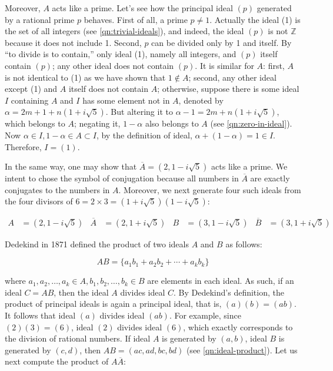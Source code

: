 \documentclass[b5paper]{article}
\begin{document}
Moreover, $A$ acts like a prime. Let's see how the principal ideal $(p)$ generated by a rational prime $p$ behaves. First of all, a prime $p \ne 1$. Actually the ideal (1) is the set of all integers (see \cref{qn:trivial-ideals}), and indeed, the ideal $(p)$ is not $\mathbb{Z}$ because it does not include 1. Second, $p$ can be divided only by 1 and itself. By \enquote{to divide is to contain,} only ideal (1), namely all integers, and $(p)$ itself contain $(p)$; any other ideal does not contain $(p)$. It is similar for $A$: first, $A$ is not identical to (1) as we have shown that $1 \notin A$; second, any other ideal except (1) and $A$ itself does not contain $A$; otherwise, suppose there is some ideal $I$ containing $A$ and $I$ has some element not in $A$, denoted by $\alpha = 2m + 1 + n(1 + i\sqrt{5})$. But altering it to $\alpha - 1 = 2m + n(1 + i\sqrt{5})$, which belongs to $A$; negating it, $1 - \alpha$ also belongs to $A$ (see \cref{qn:zero-in-ideal}). Now $\alpha \in I, 1 - \alpha \in A \subset I$, by the definition of ideal, $\alpha + (1 - \alpha) = 1 \in I$. Therefore, $I = (1)$.

In the same way, one may show that $\overline{A} = (2, 1 - i\sqrt{5})$ acts like a prime. We intent to chose the symbol of conjugation because all numbers in $\overline{A}$ are exactly conjugates to the numbers in $A$. Moreover, we next generate four such ideals from the four divisors of $6 = 2 \times 3 = (1 + i\sqrt{5})(1 - i\sqrt{5})$:

\begin{align*}
A &= (2, 1 - i\sqrt{5})  & \overline{A} &= (2, 1 + i\sqrt{5}) &
B &= (3, 1 - i\sqrt{5})  & \overline{B} &= (3, 1 + i\sqrt{5})
\end{align*}

Dedekind in 1871 defined the product of two ideals $A$ and $B$ as follows:

\[
AB = \{a_1b_1 + a_2b_2 + \dotsb + a_kb_k\}
\]

where $a_1, a_2, \dotsc, a_k \in A, b_1, b_2, \dotsc, b_k \in B$ are elements in each ideal. As such, if an ideal $C = AB$, then the ideal $A$ divides ideal $C$. By Dedekind's definition, the product of principal ideals is again a principal ideal, that is, $(a)(b) = (ab)$. It follows that ideal $(a)$ divides ideal $(ab)$. For example, since $(2)(3) = (6)$, ideal $(2)$ divides ideal $(6)$, which exactly corresponds to the division of rational numbers. If ideal $A$ is generated by $(a, b)$, ideal $B$ is generated by $(c, d)$, then $AB = (ac, ad, bc, bd)$ (see \cref{qn:ideal-product}). Let us next compute the product of $A\overline{A}$:
\end{document}
